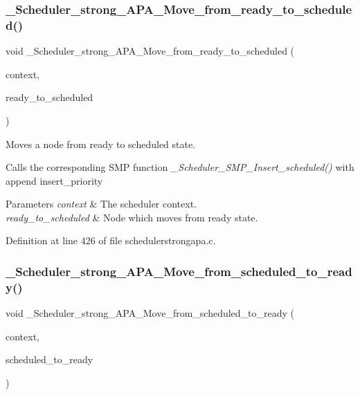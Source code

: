\subsubsection{\texorpdfstring{\+\_\+\+Scheduler\+\_\+strong\+\_\+\+A\+P\+A\+\_\+\+Move\+\_\+from\+\_\+ready\+\_\+to\+\_\+scheduled()}{\_Scheduler\_strong\_APA\_Move\_from\_ready\_to\_scheduled()}}
{\footnotesize\ttfamily void \+\_\+\+Scheduler\+\_\+strong\+\_\+\+A\+P\+A\+\_\+\+Move\+\_\+from\+\_\+ready\+\_\+to\+\_\+scheduled (\begin{DoxyParamCaption}\item[{Scheduler\+\_\+\+Context $\ast$}]{context,  }\item[{Scheduler\+\_\+\+Node $\ast$}]{ready\+\_\+to\+\_\+scheduled }\end{DoxyParamCaption})}



Moves a node from ready to scheduled state. 

Calls the corresponding S\+MP function {\itshape \+\_\+\+Scheduler\+\_\+\+S\+M\+P\+\_\+\+Insert\+\_\+scheduled()} with append insert\+\_\+priority


\begin{DoxyParams}{Parameters}
{\em context} & The scheduler context. \\
\hline
{\em ready\+\_\+to\+\_\+scheduled} & Node which moves from ready state. \\
\hline
\end{DoxyParams}


Definition at line 426 of file schedulerstrongapa.\+c.

\mbox{\label{group__RTEMSScoreSchedulerStrongAPA_ga9589d6542faf83879288d437ca84c907}} 
\subsubsection{\texorpdfstring{\+\_\+\+Scheduler\+\_\+strong\+\_\+\+A\+P\+A\+\_\+\+Move\+\_\+from\+\_\+scheduled\+\_\+to\+\_\+ready()}{\_Scheduler\_strong\_APA\_Move\_from\_scheduled\_to\_ready()}}
{\footnotesize\ttfamily void \+\_\+\+Scheduler\+\_\+strong\+\_\+\+A\+P\+A\+\_\+\+Move\+\_\+from\+\_\+scheduled\+\_\+to\+\_\+ready (\begin{DoxyParamCaption}\item[{Scheduler\+\_\+\+Context $\ast$}]{context,  }\item[{Scheduler\+\_\+\+Node $\ast$}]{scheduled\+\_\+to\+\_\+ready }\end{DoxyParamCaption})}



